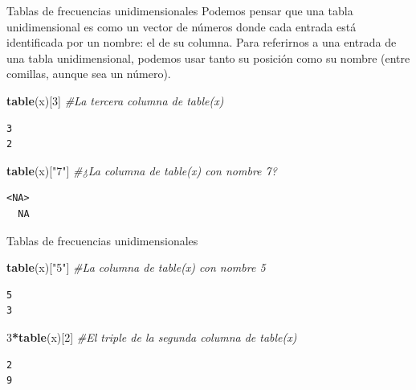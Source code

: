 \documentclass[
  ignorenonframetext,
]{beamer}
\newenvironment{Shaded}{\begin{snugshade}}{\end{snugshade}}
\newcommand{\CommentTok}[1]{\textcolor[rgb]{0.56,0.35,0.01}{\textit{#1}}}
\newcommand{\DecValTok}[1]{\textcolor[rgb]{0.00,0.00,0.81}{#1}}
\newcommand{\FunctionTok}[1]{\textcolor[rgb]{0.13,0.29,0.53}{\textbf{#1}}}
\newcommand{\NormalTok}[1]{#1}
\newcommand{\SpecialCharTok}[1]{\textcolor[rgb]{0.81,0.36,0.00}{\textbf{#1}}}
\newcommand{\StringTok}[1]{\textcolor[rgb]{0.31,0.60,0.02}{#1}}
\begin{document}
\begin{frame}[fragile]{Tablas de frecuencias unidimensionales}
\label{tablas-de-frecuencias-unidimensionales-5}
Podemos pensar que una tabla unidimensional es como un vector de números
donde cada entrada está identificada por un nombre: el de su columna.
Para referirnos a una entrada de una tabla unidimensional, podemos usar
tanto su posición como su nombre (entre comillas, aunque sea un número).

\begin{Shaded}
\begin{Highlighting}[]
\FunctionTok{table}\NormalTok{(x)[}\DecValTok{3}\NormalTok{] }\CommentTok{\#La tercera columna de table(x)}
\end{Highlighting}
\end{Shaded}

\begin{verbatim}
3 
2 
\end{verbatim}

\begin{Shaded}
\begin{Highlighting}[]
\FunctionTok{table}\NormalTok{(x)[}\StringTok{"7"}\NormalTok{] }\CommentTok{\#¿La columna de table(x) con nombre 7?}
\end{Highlighting}
\end{Shaded}

\begin{verbatim}
<NA> 
  NA 
\end{verbatim}
\end{frame}

\begin{frame}[fragile]{Tablas de frecuencias unidimensionales}
\label{tablas-de-frecuencias-unidimensionales-6}
\begin{Shaded}
\begin{Highlighting}[]
\FunctionTok{table}\NormalTok{(x)[}\StringTok{"5"}\NormalTok{] }\CommentTok{\#La columna de table(x) con nombre 5}
\end{Highlighting}
\end{Shaded}

\begin{verbatim}
5 
3 
\end{verbatim}

\begin{Shaded}
\begin{Highlighting}[]
\DecValTok{3}\SpecialCharTok{*}\FunctionTok{table}\NormalTok{(x)[}\DecValTok{2}\NormalTok{] }\CommentTok{\#El triple de la segunda columna de table(x)}
\end{Highlighting}
\end{Shaded}

\begin{verbatim}
2 
9 
\end{verbatim}
\end{frame}
\end{document}
